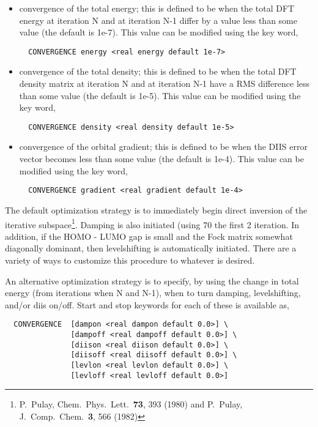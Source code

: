 \begin{itemize}
\item convergence of the total energy; this is defined to be when the
  total DFT energy at iteration N and at iteration N-1 differ by a value less
  than some value (the default is 1e-7).  This value can be modified
  using the key word,

\begin{verbatim}
  CONVERGENCE energy <real energy default 1e-7>
\end{verbatim}

\item convergence of the total density; this is defined to be when the
  total DFT density matrix at iteration N and at iteration N-1 have a
  RMS difference less than some value (the default is 1e-5).  This value can be modified
  using the key word,

\begin{verbatim}
  CONVERGENCE density <real density default 1e-5>
\end{verbatim}

\item convergence of the orbital gradient; this is defined to be when the
  DIIS error vector becomes less than some value (the default is
  1e-4).  This value can be modified using the key word,

\begin{verbatim}
  CONVERGENCE gradient <real gradient default 1e-4>
\end{verbatim}
\end{itemize}

The default optimization strategy is to immediately begin direct inversion of the
iterative subspace\footnote {P.~Pulay,  Chem.\ Phys.\ Lett.\ {\bf 73}, 
393 (1980) and P.~Pulay,  J.~Comp.~Chem.~{\bf 3}, 566 (1982)}.
Damping is also initiated (using 70%
the first 2 iteration.  In addition, if the HOMO - LUMO gap is small
and the Fock matrix somewhat diagonally dominant, then levelshifting
is automatically initiated.  There are a variety of ways to customize
this procedure to whatever is desired.

An alternative optimization strategy is to specify, by using the change 
in total energy (from iterations when N and N-1), when to turn
damping, levelshifting, and/or diis on/off.  Start and stop keywords for
each of these is available as,

\begin{verbatim}
  CONVERGENCE  [dampon <real dampon default 0.0>] \
               [dampoff <real dampoff default 0.0>] \
               [diison <real diison default 0.0>] \
               [diisoff <real diisoff default 0.0>] \
               [levlon <real levlon default 0.0>] \
               [levloff <real levloff default 0.0>]
\end{verbatim}

